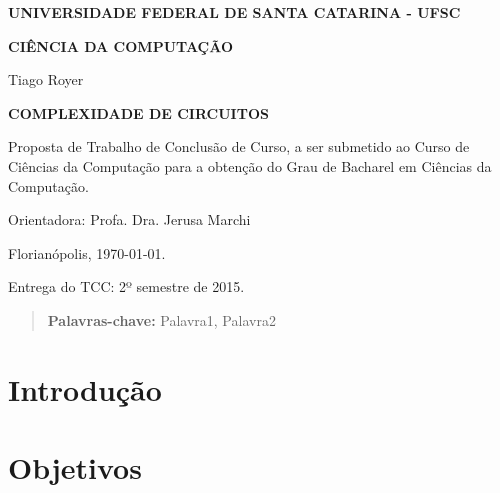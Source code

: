 \documentclass[12pt]{article}
\newcommand{\Title}[1]{\textbf{\MakeUppercase{#1}}}
\begin{document}
\begin{titlepage}
    \center

    \Title{Universidade Federal de Santa Catarina - UFSC}

    \Title{Ciência Da Computação}


    Tiago Royer


    \Title{Complexidade de Circuitos}\\[3cm]

    \begin{flushright}
        \begin{minipage}{0.5\textwidth}
            Proposta de Trabalho de Conclusão de Curso,
            a ser submetido ao Curso de Ciências da Computação
            para a obtenção do Grau de
            Bacharel em Ciências da Computação.

            Orientadora: Profa. Dra. Jerusa Marchi
        \end{minipage}
    \end{flushright}


    Florianópolis, \today.

    Entrega do TCC: 2º semestre de 2015.
\end{titlepage}

\tableofcontents
\newpage

\begin{abstract}
    \blindtext

    {\bf Palavras-chave:} Palavra1, Palavra2
\end{abstract}

\section{Introdução}

    \blindtext\cite{Sipser2006}

    \blindtext\cite{Hastad1987}

    \blindtext\cite{Sipser2006}

\section{Objetivos}

    \blindtext[1]
\end{document}
